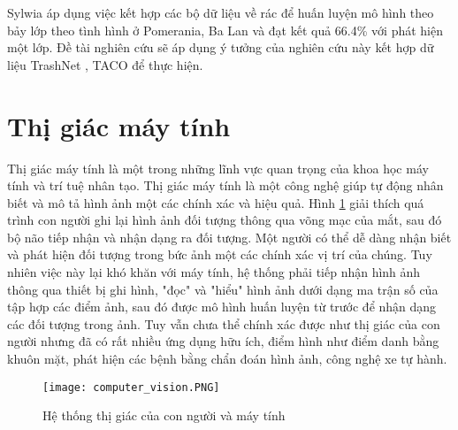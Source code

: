 \documentclass[../the.tex]{subfiles}
\begin{document}
\bigskip

{\fontsize{13}{12} \selectfont

	Sylwia \etal  \cite{Majchrowska_2022} áp dụng việc kết hợp các bộ dữ liệu về rác để huấn luyện mô hình theo bảy lớp theo tình hình ở Pomerania, Ba Lan và đạt kết quả 66.4\% với phát hiện một lớp.
	Đề tài nghiên cứu sẽ áp dụng ý tưởng của nghiên cứu này \cite{Majchrowska_2022} kết hợp dữ liệu TrashNet \cite{yang2016classification}, TACO \cite{proença2020taco} để thực hiện.

}

\section{Thị giác máy tính}
\label{sec:ttmt}

{\fontsize{13}{12}\selectfont

	Thị giác máy tính là một trong những lĩnh vực quan trọng của khoa học máy tính và trí tuệ nhân tạo. Thị giác máy tính là một công nghệ giúp tự động nhân biết và mô tả hình ảnh một các chính xác và hiệu quả. Hình \ref{fig:computer_vision} giải thích quá trình con người ghi lại hình ảnh đối tượng thông qua võng mạc của mắt, sau đó bộ não tiếp nhận và nhận dạng ra đối tượng. Một người có thể dễ dàng nhận biết và phát hiện đối tượng trong bức ảnh một các chính xác vị trí của chúng. Tuy nhiên việc này lại khó khăn với máy tính, hệ thống phải tiếp nhận hình ảnh thông qua thiết bị ghi hình, "đọc" và "hiểu" hình ảnh dưới dạng ma trận số của tập hợp các điểm ảnh, sau đó được mô hình huấn luyện từ trước để nhận dạng các đối tượng trong ảnh. Tuy vẫn chưa thể chính xác được như thị giác của con người nhưng đã có rất nhiều ứng dụng hữu ích, điểm hình như điểm danh bằng khuôn mặt, phát hiện các bệnh bằng chẩn đoán hình ảnh, công nghệ xe tự hành.

}

\begin{figure}[H]
	\centering
	\texttt{[image: computer\_vision.PNG]}
	\caption{Hệ thống thị giác của con người và máy tính}
	\label{fig:computer_vision}
\end{figure}
\end{document}
